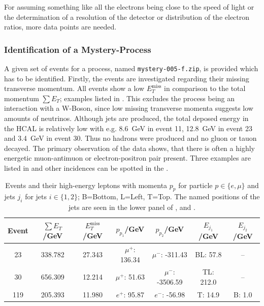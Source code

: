 \documentclass[sn-mathphys-num,icol]{sn-jnl}
\theoremstyle{thmstyleone}
\theoremstyle{thmstyletwo}
\theoremstyle{thmstylethree}
\begin{document}
For assuming something like all the electrons being close to the speed of light or the determination of a resolution of the detector or distribution of the electron ratios, more data points are needed.




\subsubsection{Identification of a Mystery-Process}
A given set of events for a process, named \verb|mystery-005-f.zip|, is provided which has to be identified. Firstly, the events are investigated regarding their missing transverse momentum. All events show a low $E_T^{\text{miss}}$ in comparison to the total momentum $\sum E_T$; examples listed in . This excludes the process being an interaction with a W-Boson, since low missing transverse momenta suggests low amounts of neutrinos. Although jets are produced, the total deposed energy in the HCAL is relatively low with e.g. \SI{8.6}{GeV} in event 11, \SI{12.8}{GeV} in event 23 and \SI{3.4}{GeV} in event 30. Thus no hadrons were produced and no gluon or tauon decayed. The primary observation of the data shows, that there is often a highly energetic muon-antimuon or electron-positron pair present. Three examples are listed in  and other incidences can be spotted in the .

\begin{table}
	\begin{tabular}{c c c c c c c}
		\hline
		Event & $\sum E_T$/GeV & $E_T^{\text{miss}}$/GeV & $p_{p_1}$/GeV   & $p_{p_2}$/GeV     & $E_{j_1}$/GeV & $E_{j_2}$/GeV \\
		\hline
		23    & 338.782        & 27.343                  & $\mu^+$: 136.34 & $\mu^-$: -311.43  & BL: 57.8      & --            \\
		30    & 656.309        & 12.214                  & $\mu^+$: 51.63  & $\mu^-$: -3506.59 & TL: 212.0     & --            \\
		119   & 205.393        & 11.980                  & $e^+$: 95.87    & $e^-$: -56.98     & T: 14.9       & B: 1.0        \\
		\hline
	\end{tabular}
  \caption{Events and their high-energy leptons with momenta $p_p$ for particle $p\in\{e, \mu\}$ and jets $j_i$ for jets $i\in\{1, 2\}$; B=Bottom, L=Left, T=Top. The named positions of the jets are seen in the lower panel of ,  and .}\label{tab:events}
\end{table}
\end{document}
